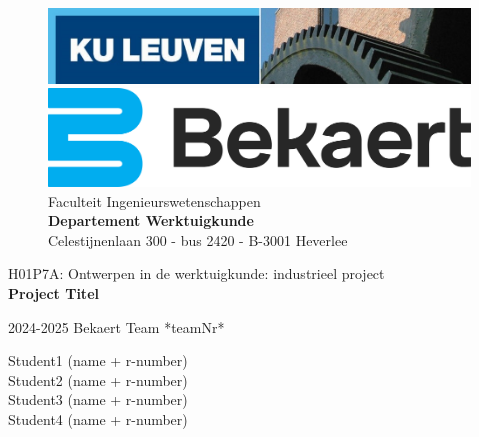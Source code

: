 \thispagestyle{empty}
\begin{figure}[h]
    \includegraphics[width=11.20cm]{KUL_logo.jpg}
    \vfill
    \includegraphics[width=11.20cm]{company_logo.png}
    \vfill
    \vspace*{5mm}
    Faculteit Ingenieurswetenschappen\\
    \textbf{Departement Werktuigkunde}\\
    Celestijnenlaan 300 - bus 2420 - B-3001 Heverlee\\
\end{figure}
\vspace*{2cm}

\begin{center}
    \Large{H01P7A: Ontwerpen in de werktuigkunde: industrieel project} \\ 
    \vspace*{3cm}
    \Huge\textbf{Project Titel}\\
    \vfill
\end{center}

\noindent %
\begin{minipage}[t]{0.5\textwidth}
    \raggedright %
    2024-2025 Bekaert Team *teamNr* 
\end{minipage}%
\begin{minipage}[t]{0.5\textwidth}
    \raggedleft %
    Student1 (name + r-number) \\
    Student2 (name + r-number)\\
    Student3 (name + r-number) \\
    Student4 (name + r-number)\\
\end{minipage}
\vspace{3cm}
\restoregeometry

